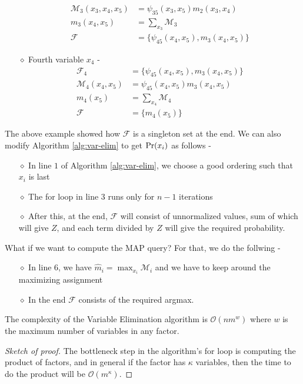 \begin{exmp}
\begin{itemize}
\begin{align*}
	\mathcal{M}_3(x_3, x_4, x_5) &= \psi_{35}(x_3, x_5) m_2(x_3, x_4) \\
	m_3(x_4, x_5) &= \sum_{x_3}\mathcal{M}_3 \\
	\mathcal{F} &= \{\psi_{45}(x_4, x_5), m_3(x_4, x_5)\}
\end{align*}
\item[$\diamond$] Fourth variable $x_4$ - 
\begin{align*}
	\mathcal{F}_4 &= \{\psi_{45}(x_4, x_5), m_3(x_4, x_5)\} \\
	\mathcal{M}_4(x_4, x_5) &= \psi_{45}(x_4, x_5)m_3(x_4, x_5) \\
	m_4(x_5) &= \sum_{x_4}\mathcal{M}_4 \\
	\mathcal{F} &= \{m_4(x_5)\}
\end{align*}
\end{itemize}
\end{exmp}
The above example showed how $\mathcal F$ is a singleton set at the end. We can also modify Algorithm \ref{alg:var-elim} to get $\text{Pr}(x_i)$ as follows - 
\begin{itemize}
	\item[$\diamond$] In line $1$ of Algorithm \ref{alg:var-elim}, we choose a good ordering such that $x_i$ is last
	\item[$\diamond$] The for loop in line 3 runs only for $n-1$ iterations
	\item[$\diamond$] After this, at the end, $\mathcal F$ will consist of unnormalized values, sum of which will give $Z$, and each term divided by $Z$ will give the required probability.
\end{itemize}
What if we want to compute the MAP query? For that, we do the follwing - 
\begin{itemize}
	\item[$\diamond$] In line 6, we have $\hat{m}_i = \max_{x_i} \mathcal{M}_i$ and we have to keep around the maximizing assignment
	\item[$\diamond$] In the end $\mathcal F$ consists of the required argmax.
\end{itemize}
\begin{thm}
The complexity of the Variable Elimination algorithm is $\mathcal{O}(nm^w)$ where $w$ is the maximum number of variables in any factor.
\end{thm}
\begin{proof}[Sketch of proof]
The bottleneck step in the algorithm's for loop is computing the product of factors, and in general if the factor has $\kappa$ variables, then the time to do the product will be $\mathcal{O}(m^\kappa)$.
\end{proof}
